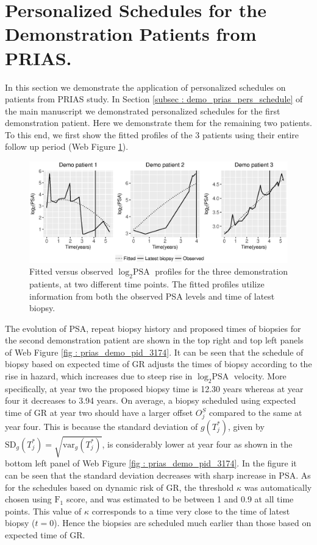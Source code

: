 \section{Personalized Schedules for the Demonstration Patients from PRIAS.}
\label{sec : demo_3174_2340}

In this section we demonstrate the application of personalized schedules on patients from PRIAS study. In Section \ref{subsec : demo_prias_pers_schedule} of the main manuscript we demonstrated personalized schedules for the first demonstration patient. Here we demonstrate them for the remaining two patients. To this end, we first show the fitted profiles of the 3 patients using their entire follow up period (Web Figure \ref{fig : fitted_demo_patients_t3}).

\begin{figure}[!htb]
\centerline{\includegraphics[width=\columnwidth]{images/model_fit/fitted_demo_patients_t3.eps}}
\caption{Fitted versus observed $\log_2 \mbox{PSA}$ profiles for the three demonstration patients, at two different time points. The fitted profiles utilize information from both the observed PSA levels and time of latest biopsy.}
\label{fig : fitted_demo_patients_t3}
\end{figure}

The evolution of PSA, repeat biopsy history and proposed times of biopsies for the second demonstration patient are shown in the top right and top left panels of Web Figure \ref{fig : prias_demo_pid_3174}. It can be seen that the schedule of biopsy based on expected time of GR adjusts the times of biopsy according to the rise in hazard, which increases due to steep rise in $\log_2 \mbox{PSA}$ velocity. More specifically, at year two the proposed biopsy time is 12.30 years whereas at year four it decreases to 3.94 years. On average, a biopsy scheduled using expected time of GR at year two should have a larger offset $O^S_j$ compared to the same at year four. This is because the standard deviation of $g(T^*_j)$, given by $\mbox{SD}_g(T^*_j) = \sqrt{\mbox{var}_g(T^*_j)}$, is considerably lower at year four as shown in the bottom left panel of Web Figure \ref{fig : prias_demo_pid_3174}. In the figure it can be seen that the standard deviation decreases with sharp increase in PSA. As for the schedules based on dynamic risk of GR, the threshold $\kappa$ was automatically chosen using $\mbox{F}_1$ score, and was estimated to be between 1 and 0.9 at all time points. This value of $\kappa$ corresponds to a time very close to the time of latest biopsy ($t=0$). Hence the biopsies are scheduled much earlier than those based on expected time of GR.

